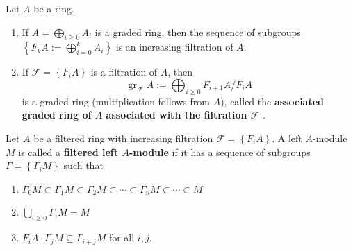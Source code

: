 \documentclass[12pt, oneside]{book}
\begin{document}
\begin{proposition}
    Let $A$ be a ring.
    \begin{enumerate}
        \item
              If $A=\bigoplus_{i\geq 0} A_i $ is a graded ring, then the sequence of subgroups $\left\{F_kA:=\bigoplus_{i=0}^k A_i\right\}$ is an increasing filtration of $A$.
        \item
              If $\mathcal{F}=\left\{F_iA\right\}$ is a filtration of $A$, then
              \begin{equation*}
                  \operatorname{gr}_{\mathcal{F}}A
                  :=
                  \bigoplus_{i\geq 0} F_{i+1}A / F_iA
              \end{equation*}
              is a graded ring (multiplication follows from $A$), called the \textbf{associated graded ring of $A$ associated with the filtration $\mathcal{F}$} .
    \end{enumerate}
\end{proposition}


\begin{definition}
    Let $A$ be a filtered ring with increasing filtration $\mathcal{F}=\left\{F_iA\right\}$. A left $A$-module $M$ is called a \textbf{filtered left $A$-module} if it has a sequence of subgroups $\Gamma=\left\{\Gamma_iM\right\}$ such that
    \begin{enumerate}[label=(\roman*)]
        \item
              $\Gamma_0M \subset \Gamma_1M \subset \Gamma_2M \subset \cdots \subset \Gamma_nM \subset \cdots \subset M$
        \item
              $\bigcup_{i\geq 0} \Gamma_iM = M$
        \item
              $F_iA  \cdot \Gamma_jM \subseteq \Gamma_{i+j}M$ for all $i,j$.
    \end{enumerate}
\end{definition}
\end{document}
